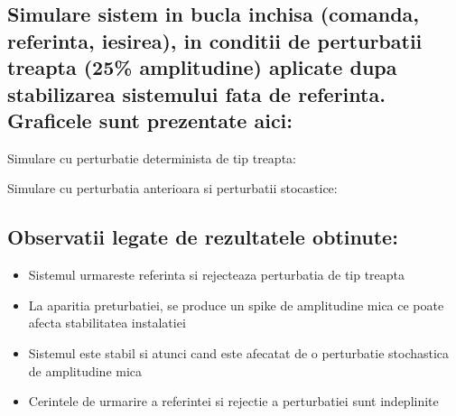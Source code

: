 \documentclass[12pt,english]{article}
\begin{document}
\subsection {Simulare sistem in bucla inchisa (comanda, referinta, iesirea), in conditii de perturbatii treapta (25\% amplitudine) aplicate dupa stabilizarea sistemului fata de referinta. Graficele sunt prezentate aici: }

Simulare cu perturbatie determinista de tip treapta:
\begin{center}
\end{center}

Simulare cu perturbatia anterioara si perturbatii stocastice:
\begin{center}
\end{center}

\subsection {Observatii legate de rezultatele obtinute: }
\begin{itemize}
  \item Sistemul urmareste referinta si rejecteaza perturbatia de tip treapta
  \item La aparitia preturbatiei, se produce un spike de amplitudine mica ce poate afecta stabilitatea instalatiei
  \item Sistemul este stabil si atunci cand este afecatat de o perturbatie stochastica de amplitudine mica 
  \item Cerintele de urmarire a referintei si rejectie a perturbatiei sunt indeplinite
\end{itemize}
\end{document}
